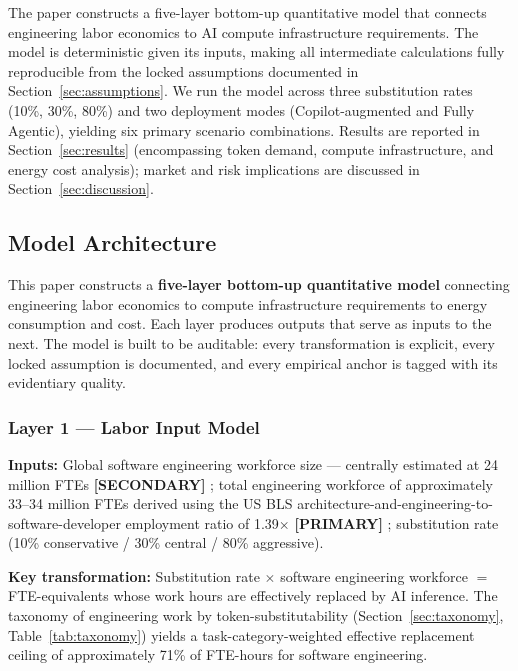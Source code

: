 \documentclass{article}
\newcommand{\PRIMARY}{\textbf{[PRIMARY]}}
\newcommand{\SECONDARY}{\textbf{[SECONDARY]}}
\begin{document}
The paper constructs a five-layer bottom-up quantitative model that connects engineering
labor economics to AI compute infrastructure requirements. The model is deterministic
given its inputs, making all intermediate calculations fully reproducible from the locked
assumptions documented in Section~\ref{sec:assumptions}. We run the model across three
substitution rates (10\%, 30\%, 80\%) and two deployment modes (Copilot-augmented and
Fully Agentic), yielding six primary scenario combinations. Results are reported in Section~\ref{sec:results} (encompassing token demand,
compute infrastructure, and energy cost analysis); market and risk implications are
discussed in Section~\ref{sec:discussion}.

\subsection{Model Architecture}
\label{sec:model-arch}

This paper constructs a \textbf{five-layer bottom-up quantitative model} connecting
engineering labor economics to compute infrastructure requirements to energy consumption
and cost. Each layer produces outputs that serve as inputs to the next. The model is
built to be auditable: every transformation is explicit, every locked assumption is
documented, and every empirical anchor is tagged with its evidentiary quality.

\subsubsection*{Layer 1 --- Labor Input Model}

\textbf{Inputs:} Global software engineering workforce size --- centrally estimated at 24
million FTEs \SECONDARY{} \citep{jetbrains2025survey,evans2025developers}; total engineering workforce of approximately 33--34 million
FTEs derived using the US BLS architecture-and-engineering-to-software-developer
employment ratio of 1.39$\times$ \PRIMARY{} \citep{bls2024oes}; substitution rate (10\% conservative / 30\%
central / 80\% aggressive).

\textbf{Key transformation:} Substitution rate $\times$ software engineering workforce
$=$ FTE-equivalents whose work hours are effectively replaced by AI inference. The
taxonomy of engineering work by token-substitutability (Section~\ref{sec:taxonomy},
Table~\ref{tab:taxonomy}) yields a task-category-weighted effective replacement ceiling
of approximately 71\% of FTE-hours for software engineering.
\end{document}
